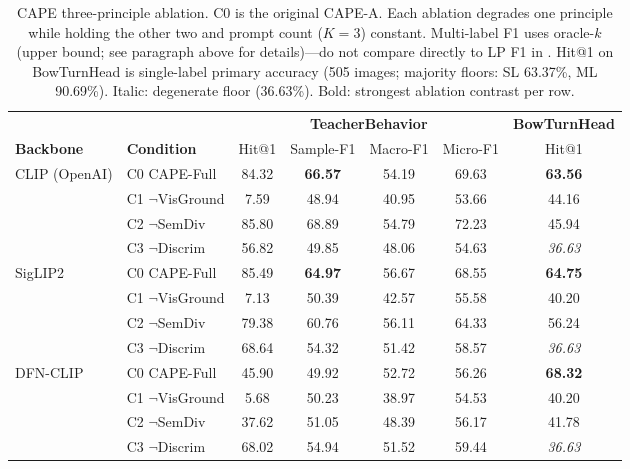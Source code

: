 \documentclass[electronics,article,submit,pdftex,moreauthors]{Definitions/mdpi}
\begin{document}
\begin{table}[H]
\caption{CAPE three-principle ablation. \textsc{C0} is the original CAPE-A. Each ablation degrades one principle while holding the other two and prompt count ($K=3$) constant. Multi-label F1 uses oracle-$k$ (upper bound; see paragraph above for details)---do not compare directly to LP F1 in . Hit@1 on BowTurnHead is single-label primary accuracy (505 images; majority floors: SL 63.37\%, ML 90.69\%). Italic: degenerate floor (36.63\%). Bold: strongest ablation contrast per row.}
\label{tab:cape_ablation}
\centering
\small
\begin{tabular}{l l cccc c}
\toprule
& & \multicolumn{4}{c}{\textbf{TeacherBehavior}} & \textbf{BowTurnHead} \\
\cmidrule(lr){3-6}\cmidrule(lr){7-7}
\textbf{Backbone} & \textbf{Condition} & Hit@1 & Sample-F1 & Macro-F1 & Micro-F1 & Hit@1 \\
\midrule
\multirow{4}{*}{CLIP (OpenAI)}
 & \textsc{C0} CAPE-Full        & 84.32 & \textbf{66.57} & 54.19 & 69.63 & \textbf{63.56} \\
 & \textsc{C1} $\neg$VisGround  &  7.59 & 48.94 & 40.95 & 53.66 & 44.16 \\
 & \textsc{C2} $\neg$SemDiv     & 85.80 & 68.89 & 54.79 & 72.23 & 45.94 \\
 & \textsc{C3} $\neg$Discrim    & 56.82 & 49.85 & 48.06 & 54.63 & \textit{36.63} \\
\midrule
\multirow{4}{*}{SigLIP2}
 & \textsc{C0} CAPE-Full        & 85.49 & \textbf{64.97} & 56.67 & 68.55 & \textbf{64.75} \\
 & \textsc{C1} $\neg$VisGround  &  7.13 & 50.39 & 42.57 & 55.58 & 40.20 \\
 & \textsc{C2} $\neg$SemDiv     & 79.38 & 60.76 & 56.11 & 64.33 & 56.24 \\
 & \textsc{C3} $\neg$Discrim    & 68.64 & 54.32 & 51.42 & 58.57 & \textit{36.63} \\
\midrule
\multirow{4}{*}{DFN-CLIP}
 & \textsc{C0} CAPE-Full        & 45.90 & 49.92 & 52.72 & 56.26 & \textbf{68.32} \\
 & \textsc{C1} $\neg$VisGround  &  5.68 & 50.23 & 38.97 & 54.53 & 40.20 \\
 & \textsc{C2} $\neg$SemDiv     & 37.62 & 51.05 & 48.39 & 56.17 & 41.78 \\
 & \textsc{C3} $\neg$Discrim    & 68.02 & 54.94 & 51.52 & 59.44 & \textit{36.63} \\
\bottomrule
\end{tabular}
\end{table}
\end{document}
